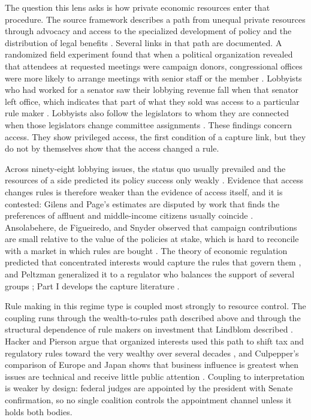 \documentclass[11pt,letterpaper]{article}
\theoremstyle{definition}
\theoremstyle{remark}
\begin{document}
The question this lens asks is how private economic resources enter that procedure. The source framework describes a path from unequal private resources through advocacy and access to the specialized development of policy and the distribution of legal benefits \citep[Section~8]{largo2026hbs}. Several links in that path are documented. A randomized field experiment found that when a political organization revealed that attendees at requested meetings were campaign donors, congressional offices were more likely to arrange meetings with senior staff or the member \citep{kalla2016}. Lobbyists who had worked for a senator saw their lobbying revenue fall when that senator left office, which indicates that part of what they sold was access to a particular rule maker \citep{blanes2012}. Lobbyists also follow the legislators to whom they are connected when those legislators change committee assignments \citep{bertrand2014}. These findings concern access. They show privileged access, the first condition of a capture link, but they do not by themselves show that the access changed a rule.

Across ninety-eight lobbying issues, the status quo usually prevailed and the resources of a side predicted its policy success only weakly \citep{baumgartner2009}. Evidence that access changes rules is therefore weaker than the evidence of access itself, and it is contested: Gilens and Page's estimates \citep{gilens2014} are disputed by work that finds the preferences of affluent and middle-income citizens usually coincide \citep{branham2017}. Ansolabehere, de Figueiredo, and Snyder observed that campaign contributions are small relative to the value of the policies at stake, which is hard to reconcile with a market in which rules are bought \citep{ansolabehere2003}. The theory of economic regulation predicted that concentrated interests would capture the rules that govern them \citep{stigler1971}, and Peltzman generalized it to a regulator who balances the support of several groups \citep{peltzman1976}; Part I develops the capture literature \citep{long2026financial}.

Rule making in this regime type is coupled most strongly to resource control. The coupling runs through the wealth-to-rules path described above and through the structural dependence of rule makers on investment that Lindblom described \citep{lindblom1977}. Hacker and Pierson argue that organized interests used this path to shift tax and regulatory rules toward the very wealthy over several decades \citep{hackerpierson2010}, and Culpepper's comparison of Europe and Japan shows that business influence is greatest when issues are technical and receive little public attention \citep{culpepper2010}. Coupling to interpretation is weaker by design: federal judges are appointed by the president with Senate confirmation, so no single coalition controls the appointment channel unless it holds both bodies.
\end{document}
